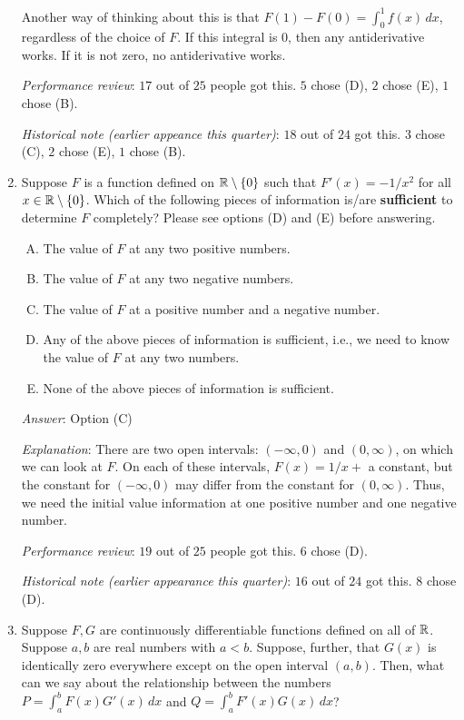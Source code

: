 \documentclass[10pt]{amsart}
\begin{document}
\begin{enumerate}
  Another way of thinking about this is that $F(1) - F(0) = \int_0^1
  f(x) \, dx$, regardless of the choice of $F$. If this integral is
  $0$, then any antiderivative works. If it is not zero, no
  antiderivative works.

  {\em Performance review}: $17$ out of $25$ people got this. $5$
  chose (D), $2$ chose (E), $1$ chose (B).

  {\em Historical note (earlier appeance this quarter)}: $18$ out of
  $24$ got this. $3$ chose (C), $2$ chose (E), $1$ chose (B).

\item Suppose $F$ is a function defined on $\mathbb{R} \setminus \{ 0 \}$ such
  that $F'(x) = -1/x^2$ for all $x \in \mathbb{R} \setminus \{ 0 \}$. Which of
  the following pieces of information is/are {\bf sufficient} to determine
  $F$ completely? Please see options (D) and (E) before answering.

  \begin{enumerate}[(A)]
  \item The value of $F$ at any two positive numbers.
  \item The value of $F$ at any two negative numbers.
  \item The value of $F$ at a positive number and a negative number.
  \item Any of the above pieces of information is sufficient, i.e., we
    need to know the value of $F$ at any two numbers.
  \item None of the above pieces of information is sufficient.
  \end{enumerate}

  {\em Answer}: Option (C)

  {\em Explanation}: There are two open intervals: $(-\infty,0)$ and
  $(0,\infty)$, on which we can look at $F$. On each of these
  intervals, $F(x) = 1/x + $ a constant, but the constant for
  $(-\infty,0)$ may differ from the constant for $(0,\infty)$. Thus,
  we need the initial value information at one positive number and one
  negative number.

  {\em Performance review}: $19$ out of $25$ people got this. $6$
  chose (D).

  {\em Historical note (earlier appearance this quarter)}: $16$ out of
  $24$ got this. $8$ chose (D).

\item Suppose $F,G$ are continuously differentiable functions defined
  on all of $\mathbb{R}$. Suppose $a,b$ are real numbers with $a <
  b$. Suppose, further, that $G(x)$ is identically zero everywhere
  except on the open interval $(a,b)$. Then, what can we say about the
  relationship between the numbers $P = \int_a^b F(x)G'(x) \,dx$ and
  $Q = \int_a^b F'(x)G(x) \, dx$?


\end{enumerate}
\end{document}
